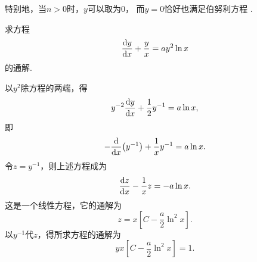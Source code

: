 特别地，当\(n>0\)时，\(y\)可以取为\(0\)，
而\(y=0\)恰好也满足伯努利方程  .

\begin{example}
求方程\begin{equation*}
	\dv{y}{x} + \frac{y}{x} = a y^2 \ln x
\end{equation*}的通解.
\begin{solution}
以\(y^2\)除方程的两端，得\begin{equation*}
	y^{-2} \dv{y}{x} + \frac{1}{2} y^{-1} = a \ln x,
\end{equation*}
即\begin{equation*}
	- \dv{x}(y^{-1}) + \frac{1}{x} y^{-1} = a \ln x.
\end{equation*}
令\(z = y^{-1}\)，则上述方程成为\begin{equation*}
	\dv{z}{x} - \frac{1}{x} z = -a \ln x.
\end{equation*}
这是一个线性方程，它的通解为\begin{equation*}
	z = x \left[ C - \frac{a}{2} \ln^2 x \right].
\end{equation*}
以\(y^{-1}\)代\(z\)，得所求方程的通解为\begin{equation*}
	yx \left[ C - \frac{a}{2} \ln^2 x \right] = 1.
\end{equation*}
\end{solution}
\end{example}


